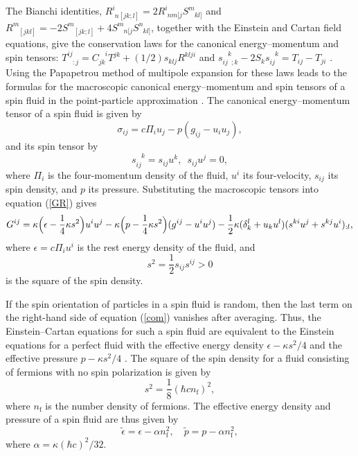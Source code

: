 \documentclass[prd,onecolumn,nofootinbib]{revtex4}
\begin{document}
The Bianchi identities, $R^i_{\phantom{i}n[jk;l]}=2R^i_{\phantom{i}nm[j}S^m_{\phantom{m}kl]}$ and $R^m_{\phantom{m}[jkl]}=-2S^m_{\phantom{m}[jk;l]}+4S^m_{\phantom{m}n[j}S^n_{\phantom{n}kl]}$, together with the Einstein and Cartan field equations, give the conservation laws for the canonical energy--momentum and spin tensors: $T^{ij}_{\phantom{ij}:j}=C_{jk}^{\phantom{jk}i}T^{jk}+(1/2)s_{klj}R^{klji}$ and $s_{ij\phantom{k};k}^{\phantom{ij}k}-2S_k s_{ij}^{\phantom{ij}k}=T_{ij}-T_{ji}$ \cite{ScKi,Hehl,review,Lor,Niko,HHK}.
Using the Papapetrou method of multipole expansion for these laws \cite{Pap} leads to the formulas for the macroscopic canonical energy--momentum and spin tensors of a spin fluid in the point-particle approximation \cite{Niko,Dir}.
The canonical energy--momentum tensor of a spin fluid is given by \cite{HHK}
\begin{equation}
\sigma_{ij}=c\Pi_i u_j-p(g_{ij}-u_i u_j),
\end{equation}
and its spin tensor by
\begin{equation}
s_{ij}^{\phantom{ij}k}=s_{ij}u^k,\,\,\,s_{ij}u^j=0,
\end{equation}
where $\Pi_i$ is the four-momentum density of the fluid, $u^i$ its four-velocity, $s_{ij}$ its spin density, and $p$ its pressure.
Substituting the macroscopic tensors into equation (\ref{GR}) gives \cite{HHK,Gas,Bre,torsion1,Kuc}
\begin{equation}
G^{ij}=\kappa\Bigl(\epsilon-\frac{1}{4}\kappa s^2\Bigr)u^i u^j-\kappa\Bigl(p-\frac{1}{4}\kappa s^2\Bigr)(g^{ij}-u^i u^j)-\frac{1}{2}\kappa(\delta^l_k+u_k u^l)(s^{ki}u^j+s^{kj}u^i)_{:l},
\label{com}
\end{equation}
where $\epsilon=c\Pi_i u^i$ is the rest energy density of the fluid, and
\begin{equation}
s^2=\frac{1}{2}s_{ij}s^{ij}>0
\end{equation}
is the square of the spin density.

If the spin orientation of particles in a spin fluid is random, then the last term on the right-hand side of equation (\ref{com}) vanishes after averaging.
Thus, the Einstein--Cartan equations for such a spin fluid are equivalent to the Einstein equations for a perfect fluid with the effective energy density $\epsilon-\kappa s^2/4$ and the effective pressure $p-\kappa s^2/4$ \cite{HHK,Gas,Bre,torsion1,Kuc}.
The square of the spin density for a fluid consisting of fermions with no spin polarization is given by \cite{Gas,Bre,NuPo}
\begin{equation}
s^2=\frac{1}{8}(\hbar cn_\textrm{f})^2,
\end{equation}
where $n_\textrm{f}$ is the number density of fermions.
The effective energy density and pressure of a spin fluid are thus given by
\begin{equation}
\tilde{\epsilon}=\epsilon-\alpha n_\textrm{f}^2,\quad\tilde{p}=p-\alpha n_\textrm{f}^2,
\label{eff}
\end{equation}
where $\alpha=\kappa(\hbar c)^2/32$.\\
\end{document}
